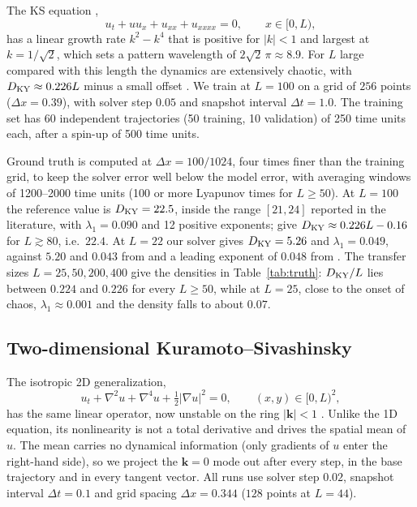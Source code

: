 The KS equation \citep{kuramoto1976,sivashinsky1977},
\begin{equation}
  u_t + u u_x + u_{xx} + u_{xxxx} = 0, \qquad x\in[0,L),
  \label{eq:ks1d}
\end{equation}
has a linear growth rate $k^2-k^4$ that is positive for $|k|<1$ and
largest at $k=1/\sqrt2$, which sets a pattern wavelength of
$2\sqrt2\,\pi\approx8.9$. For $L$ large compared with this length the
dynamics are extensively chaotic, with $D_{\mathrm{KY}}\approx0.226L$ minus a
small offset \citep{manneville1985,edson2019}. We train at $L=100$ on a
grid of $256$ points ($\Delta x = 0.39$), with solver step $0.05$ and
snapshot interval $\Delta t=1.0$. The training set has 60 independent
trajectories (50 training, 10 validation) of 250 time units each, after
a spin-up of 500 time units.

Ground truth is computed at $\Delta x = 100/1024$, four times finer than
the training grid, to keep the solver error well below the model error,
with averaging windows of 1200--2000 time units (100 or more Lyapunov
times for $L\ge50$). At $L=100$ the reference value is $D_{\mathrm{KY}}=22.5$,
inside the range $[21,24]$ reported in the literature, with
$\lambda_1=0.090$ and 12 positive exponents; \citet{edson2019} give
$D_{\mathrm{KY}}\approx0.226L-0.16$ for $L\gtrsim80$, i.e.\ $22.4$. At $L=22$ our
solver gives $D_{\mathrm{KY}}=5.26$ and $\lambda_1=0.049$, against $5.20$ and $0.043$
from \citet{edson2019} and a leading exponent of $0.048$ from
\citet{cvitanovic2010}. The transfer sizes $L=25,50,200,400$ give the
densities in Table~\ref{tab:truth}: $D_{\mathrm{KY}}/L$ lies between $0.224$ and
$0.226$ for every $L\ge50$, while at $L=25$, close to the onset of
chaos, $\lambda_1\approx0.001$ and the density falls to about $0.07$.

\subsection{Two-dimensional Kuramoto--Sivashinsky}
\label{sec:ks2d}

The isotropic 2D generalization,
\begin{equation}
  u_t + \nabla^2 u + \nabla^4 u + \tfrac12|\nabla u|^2 = 0,
  \qquad (x,y)\in[0,L)^2,
  \label{eq:ks2d}
\end{equation}
has the same linear operator, now unstable on the ring $|\bm k|<1$
\citep{kalogirou2015}. Unlike the 1D equation, its nonlinearity is not a
total derivative and drives the spatial mean of $u$. The mean carries
no dynamical information (only gradients of $u$ enter the right-hand
side), so we project the $\bm k=0$ mode out after every step, in the
base trajectory and in every tangent vector. All runs use solver step
$0.02$, snapshot interval $\Delta t=0.1$ and grid spacing
$\Delta x = 0.344$ ($128$ points at $L=44$).

